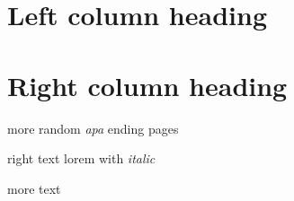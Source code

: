 \begin{pages}
\section{Left column heading}\hypertarget{left-column-heading}{}\label{left-column-heading}

\section{Right column heading}\hypertarget{right-column-heading}{}\label{right-column-heading}

more random \emph{apa}
ending pages

right text lorem with \emph{italic}
\end{pages}
\Pages
more text

